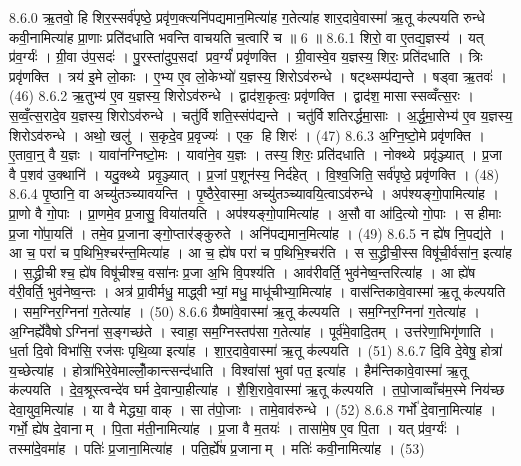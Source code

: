8.6.0
ऋ॒तवो॒ हि शिर॒स्सर्व॑पृष्ठे॒ प्रवृ॑ण॒क्त्यनि॑पद्यमान॒मित्या॑ह ग॒तेत्या॑ह शार॒दावे॒वास्मा॑ ऋ॒तू क॑ल्पयति रुन्धे कवी॒नामित्या॑ह प्रा॒णाः प्रति॑दधाति भवन्ति वाचयति च॒त्वारि॑ च ॥ 6 ॥
8.6.1
शिरो॒ वा ए॒तद्य॒ज्ञस्य॑ । यत् प्र॑व॒र्ग्यः॑ । ग्री॒वा उ॑प॒सदः॑ । पु॒रस्ता॑दुप॒सदां प्रव॒र्ग्यं॑ प्रवृ॑णक्ति । ग्री॒वास्वे॒व य॒ज्ञस्य॒ शिरः॒ प्रति॑दधाति । त्रिः प्रवृ॑णक्ति । त्रय॑ इ॒मे लो॒काः । ए॒भ्य ए॒व लो॒केभ्यो॑ य॒ज्ञस्य॒ शिरोऽव॑रुन्धे । षट्थ्सम्प॑द्यन्ते । षड्वा ऋ॒तवः॑ । (46)
8.6.2
ऋ॒तुभ्य॑ ए॒व य॒ज्ञस्य॒ शिरोऽव॑रुन्धे । द्वाद॑श॒कृत्वः॒ प्रवृ॑णक्ति । द्वाद॑श॒ मासास्सव्वँत्स॒रः । स॒व्वँ॒त्स॒रादे॒व य॒ज्ञस्य॒ शिरोऽव॑रुन्धे । चतु॑र्विशति॒स्संप॑द्यन्ते । चतु॑र्विशतिरर्द्धमा॒साः । अ॒र्द्ध॒मा॒सेभ्य॑ ए॒व य॒ज्ञस्य॒ शिरोऽव॑रुन्धे । अथो॒ खलु॑ । स॒कृदे॒व प्र॒वृज्यः॑ । एक॒ हि शिरः॑ । (47)
8.6.3
अ॒ग्नि॒ष्टो॒मे प्रवृ॑णक्ति । ए॒तावा॒न्॒ वै य॒ज्ञः । यावा॑नग्निष्टो॒मः । यावा॑ने॒व य॒ज्ञः । तस्य॒ शिरः॒ प्रति॑दधाति । नोक्थ्ये प्रवृ॑ञ्ज्यात् । प्र॒जा वै प॒शव॑ उ॒क्थानि॑ । यदु॒क्थ्ये प्रवृ॒ञ्ज्यात् । प्र॒जां प॒शून॑स्य॒ निर्द॑हेत् । वि॒श्व॒जिति॒ सर्व॑पृष्ठे॒ प्रवृ॑णक्ति । (48)
8.6.4
पृ॒ष्ठानि॒ वा अच्यु॑तञ्च्यावयन्ति । पृ॒ष्ठैरे॒वास्मा॒ अच्यु॑तञ्च्यावयि॒त्वाऽव॑रुन्धे । अप॑श्यङ्गो॒पामित्या॑ह । प्रा॒णो वै गो॒पाः । प्रा॒णमे॒व प्र॒जासु॒ विया॑तयति । अप॑श्यङ्गो॒पामित्या॑ह । अ॒सौ वा आ॑दि॒त्यो गो॒पाः । स हीमाः प्र॒जा गो॑पा॒यति॑ । तमे॒व प्र॒जानाङ्गो॒प्तार॑ङ्कुरुते । अनि॑पद्यमान॒मित्या॑ह । (49)
8.6.5
न ह्ये॑ष नि॒पद्य॑ते । आ च॒ परा॑ च प॒थिभि॒श्चर॑न्त॒मित्या॑ह । आ च॒ ह्ये॑ष परा॑ च प॒थिभि॒श्चर॑ति । स स॒द्ध्रीची॒स्स विषू॑ची॒र्वसा॑न॒ इत्या॑ह । स॒द्ध्रीचीश्च॒ ह्ये॑ष विषू॑चीश्च॒ वसा॑नः प्र॒जा अ॒भि वि॒पश्य॑ति । आव॑रीवर्ति॒ भुव॑नेष्व॒न्तरित्या॑ह । आ ह्ये॑ष व॑री॒वर्ति॒ भुव॑नेष्व॒न्तः । अत्र॑ प्रा॒वीर्मधु॒ माद्ध्वीभ्यां॒ मधु॒ माधू॑चीभ्या॒मित्या॑ह । वास॑न्तिकावे॒वास्मा॑ ऋ॒तू क॑ल्पयति । सम॒ग्निर॒ग्निना॑ ग॒तेत्या॑ह । (50)
8.6.6
ग्रैष्मा॑वे॒वास्मा॑ ऋ॒तू क॑ल्पयति । सम॒ग्निर॒ग्निना॑ ग॒तेत्या॑ह । अ॒ग्निर्ह्ये॑वैषोऽग्निना॑ स॒ङ्गच्छ॑ते । स्वाहा॒ सम॒ग्निस्तप॑सा ग॒तेत्या॑ह । पूर्व॑मे॒वादि॒तम् । उत्त॑रेणा॒भिगृ॑णाति । ध॒र्ता दि॒वो विभा॑सि॒ रज॑सः पृथि॒व्या इत्या॑ह । शा॒र॒दावे॒वास्मा॑ ऋ॒तू क॑ल्पयति । (51)
8.6.7
दि॒वि दे॒वेषु॒ होत्रा॑ य॒च्छेत्या॑ह । होत्रा॑भिरे॒वेमाल्लोँ॒कान्त्सन्द॑धाति । विश्वा॑सां भुवां पत॒ इत्या॑ह । हैम॑न्तिकावे॒वास्मा॑ ऋ॒तू क॑ल्पयति । दे॒व॒श्रूस्त्वन्दे॑व घर्म दे॒वान्पा॒हीत्या॑ह । शै॒शि॒रावे॒वास्मा॑ ऋ॒तू क॑ल्पयति । त॒पो॒जाव्वाँच॑म॒स्मे निय॑च्छ देवा॒युव॒मित्या॑ह । या वै मेद्ध्या॒ वाक् । सा त॑पो॒जाः । तामे॒वाव॑रुन्धे । (52)
8.6.8
गर्भो॑ दे॒वाना॒मित्या॑ह । गर्भो॒ ह्ये॑ष दे॒वानाम् । पि॒ता म॑ती॒नामित्या॑ह । प्र॒जा वै म॒तयः॑ । तासा॑मे॒ष ए॒व पि॒ता । यत् प्र॑व॒र्ग्यः॑ । तस्मा॑दे॒वमा॑ह । पतिः॑ प्र॒जाना॒मित्या॑ह । पति॒र्ह्ये॑ष प्र॒जानाम् । मतिः॑ कवी॒नामित्या॑ह । (53)
